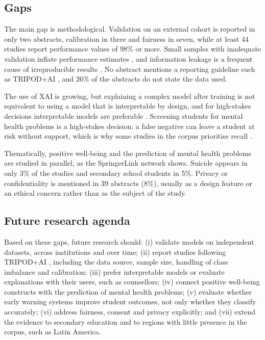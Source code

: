 \documentclass[11pt,a4paper]{article}
\begin{document}
\subsection{Gaps}

The main gap is methodological. Validation on an external cohort is reported in only two abstracts, calibration in three and fairness in seven, while at least 44 studies report performance values of 98\% or more. Small samples with inadequate validation inflate performance estimates \cite{vabalas2019validation}, and information leakage is a frequent cause of irreproducible results \cite{kapoor2023leakage}. No abstract mentions a reporting guideline such as TRIPOD+AI \cite{collins2024tripodai}, and 26\% of the abstracts do not state the data used.

The use of XAI is growing, but explaining a complex model after training is not equivalent to using a model that is interpretable by design, and for high-stakes decisions interpretable models are preferable \cite{rudin2019blackbox}. Screening students for mental health problems is a high-stakes decision: a false negative can leave a student at risk without support, which is why some studies in the corpus prioritise recall \cite{S008}.

Thematically, positive well-being and the prediction of mental health problems are studied in parallel, as the SpringerLink network shows. Suicide appears in only 3\% of the studies and secondary school students in 5\%. Privacy or confidentiality is mentioned in 39 abstracts (8\%), usually as a design feature or an ethical concern rather than as the subject of the study.

\subsection{Future research agenda}

Based on these gaps, future research should: (i) validate models on independent datasets, across institutions and over time; (ii) report studies following TRIPOD+AI \cite{collins2024tripodai}, including the data source, sample size, handling of class imbalance and calibration; (iii) prefer interpretable models or evaluate explanations with their users, such as counsellors; (iv) connect positive well-being constructs with the prediction of mental health problems; (v) evaluate whether early warning systems improve student outcomes, not only whether they classify accurately; (vi) address fairness, consent and privacy explicitly; and (vii) extend the evidence to secondary education and to regions with little presence in the corpus, such as Latin America.
\end{document}
